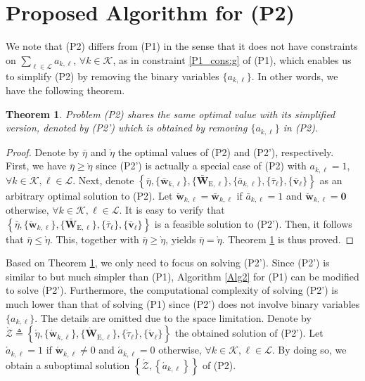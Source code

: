 \documentclass[12pt,draftclsnofoot, onecolumn]{IEEEtran}
\theoremstyle{plain}
\newtheorem{theo}{Theorem}
\begin{document}
\begin{sloppypar}
\section{Proposed Algorithm for (P2)}\label{Sec:P2_solution}
We note that (P2) differs from (P1) in the sense that it does not have constraints on $\sum_{\ell \in\mathcal L} a_{k,\ell}$, $\forall k\in\mathcal K$, as in constraint \eqref{P1_cons:g} of (P1), which enables us to simplify (P2) by removing the binary variables $\{a_{k,\ell}\}$. In other words, we have the following theorem. 
\begin{theo}\label{theo2}
	\vspace{-3mm}
	Problem (P2) shares the same optimal value with its simplified version, denoted by (P2') which is obtained by removing $\{a_{k,\ell}\}$ in (P2).
\end{theo}
\begin{proof}
	\vspace{-3mm}
	Denote by $\bar{\eta}$ and $\grave{\eta}$ the optimal values of (P2) and (P2'), respectively. First, we have $\bar{\eta} \geq \grave{\eta}$ since (P2') is actually a special case of (P2) with $a_{k,\ell} = 1$, $\forall k \in\mathcal K, \ell\in\mathcal L$. Next, denote $\left\lbrace \bar\eta, \{\bar{\mathbf w}_{k,\ell}\}, \{\bar{\mathbf W}_{\mathrm E,\ell}\},\{ \bar a_{k,\ell}\}, \{\bar{\tau}_\ell\},\{\bar{\mathbf v}_\ell\}\right\rbrace$ as an arbitrary optimal solution to (P2). Let $\breve{\mathbf w}_{k,\ell} = \bar{\mathbf w}_{k,\ell}$ if $\bar a_{k,\ell} = 1$ and $\breve{\mathbf w}_{k,\ell} = \mathbf 0$ otherwise, $\forall k\in\mathcal K, \ell\in\mathcal L$. It is easy to verify that $\left\lbrace\bar\eta, \{\breve{\mathbf w}_{k,\ell}\}, \{\bar{\mathbf W}_{\mathrm E,\ell}\}, \{\bar{\tau}_\ell\},\{\bar{\mathbf v}_\ell\}\right\rbrace$ is a feasible solution to (P2'). Then, it follows that $\bar\eta \leq \grave{\eta}$. This, together with $\bar\eta \geq \grave{\eta}$, yields $\bar\eta = \grave{\eta}$. Theorem \ref{theo2} is thus proved. 
	\vspace{-2mm} 
\end{proof}
Based on Theorem \ref{theo2}, we only need to focus on solving (P2'). Since (P2') is similar to but much simpler than (P1), Algorithm \ref{Alg2} for (P1) can be modified to solve (P2'). Furthermore, the computational complexity of solving (P2') is much lower than that of solving (P1) since (P2') does not involve binary variables $\{a_{k,\ell}\}$. The details are omitted due to the space limitation. Denote by $\acute{\mathcal Z} \triangleq \left\lbrace\acute\eta, \{\acute{\mathbf w}_{k,\ell}\}, \{\acute{\mathbf W}_{\mathrm E,\ell}\}, \{\acute{\tau}_\ell\},\{\acute{\mathbf v}_\ell\}\right\rbrace$ the obtained solution of (P2'). Let $\acute a_{k,\ell} = 1$ if $\acute{\mathbf w}_{k,\ell} \neq 0$ and $\acute a_{k,\ell} = 0$ otherwise, $\forall k\in\mathcal K, \ell\in\mathcal L$. By doing so, we obtain a suboptimal solution $\left\lbrace \acute{\mathcal Z}, \left\lbrace \acute a_{k,\ell} \right\rbrace \right\rbrace$ of (P2).   


\end{sloppypar}
\end{document}
